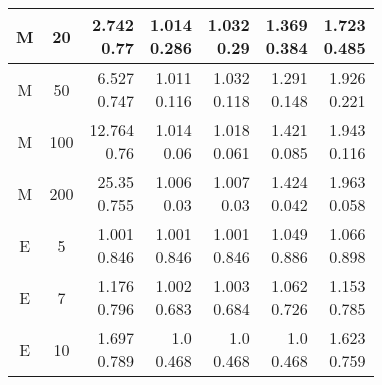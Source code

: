 \documentclass{article}
\begin{document}
{\begin{tabular}{|c c|r r r r r|}
  \hline
  M & 20 & \shortstack{ 2.742 \\ 0.77 } & \shortstack{ 1.014 \\ 0.286 } & \shortstack{ 1.032 \\ 0.29 } & \shortstack{ 1.369 \\ 0.384 } & \shortstack{ 1.723 \\ 0.485 } \\ 
  \hline
  M & 50 & \shortstack{ 6.527 \\ 0.747 } & \shortstack{ 1.011 \\ 0.116 } & \shortstack{ 1.032 \\ 0.118 } & \shortstack{ 1.291 \\ 0.148 } & \shortstack{ 1.926 \\ 0.221 } \\ 
  \hline
  M & 100 & \shortstack{ 12.764 \\ 0.76 } & \shortstack{ 1.014 \\ 0.06 } & \shortstack{ 1.018 \\ 0.061 } & \shortstack{ 1.421 \\ 0.085 } & \shortstack{ 1.943 \\ 0.116 } \\ 
  \hline
  M & 200 & \shortstack{ 25.35 \\ 0.755 } & \shortstack{ 1.006 \\ 0.03 } & \shortstack{ 1.007 \\ 0.03 } & \shortstack{ 1.424 \\ 0.042 } & \shortstack{ 1.963 \\ 0.058 } \\ 
  \hline\hline
  E & 5 & \shortstack{ 1.001 \\ 0.846 } & \shortstack{ 1.001 \\ 0.846 } & \shortstack{ 1.001 \\ 0.846 } & \shortstack{ 1.049 \\ 0.886 } & \shortstack{ 1.066 \\ 0.898 } \\ 
  \hline
  E & 7 & \shortstack{ 1.176 \\ 0.796 } & \shortstack{ 1.002 \\ 0.683 } & \shortstack{ 1.003 \\ 0.684 } & \shortstack{ 1.062 \\ 0.726 } & \shortstack{ 1.153 \\ 0.785 } \\ 
  \hline
  E & 10 & \shortstack{ 1.697 \\ 0.789 } & \shortstack{ 1.0 \\ 0.468 } & \shortstack{ 1.0 \\ 0.468 } & \shortstack{ 1.0 \\ 0.468 } & \shortstack{ 1.623 \\ 0.759 } \\ 

\end{tabular}}
\end{document}
